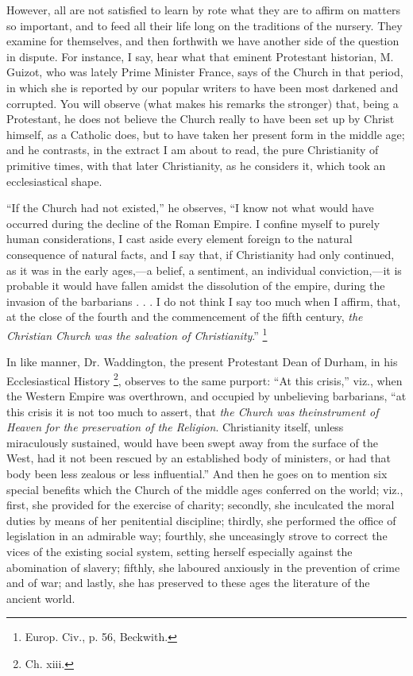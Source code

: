 However, all are not satisfied to learn by rote what
they are to affirm on matters so important, and to feed
all their life long on the traditions of the nursery.
They examine for themselves, and then forthwith we have
another side of the question in dispute. For instance, I
say, hear what that eminent Protestant historian, M.
Guizot, who was lately Prime Minister France, says of the
Church in that period, in which she is reported by our
popular writers to have been most darkened and corrupted.
You will observe (what makes his remarks the stronger)
that, being a Protestant, he does not believe the Church
really to have been set up by Christ himself, as a
Catholic does, but to have taken her present form in the
middle age; and he contrasts, in the extract I am about
to read, the pure Christianity of primitive times, with
that later Christianity, as he considers it, which took
an ecclesiastical shape.

``If the Church had not existed,'' he
observes, ``I know not what would have occurred
during the decline of the Roman Empire. I confine myself
to purely human considerations, I cast aside every
element foreign to the natural consequence of natural
facts, and I say that, if Christianity had only
continued, as it was in the early ages,—a belief, a
sentiment, an individual conviction,—it is probable
it would have fallen amidst the dissolution of the
empire, during the invasion of the barbarians . . . I do
not think I say too much when I affirm, that, at the
close of the fourth and the commencement of the fifth
century, \emph{the Christian
Church was the salvation of Christianity}.'' \footnote{Europ. Civ., p. 56, Beckwith.}

In like manner, Dr. Waddington, the present Protestant
Dean of Durham, in his Ecclesiastical History \footnote{Ch. xiii.}, observes to the same purport: ``At this
crisis,'' viz., when the Western Empire was
overthrown, and occupied by unbelieving barbarians,
``at this crisis it is not too much to assert, that \emph{the
Church was the}\emph{instrument of Heaven for the preservation
of the Religion}. Christianity itself, unless
miraculously sustained, would have been swept away from
the surface of the West, had it not been rescued by an
established body of ministers, or had that body been less
zealous or less influential.'' And then he goes on to
mention six special benefits which the Church of the
middle ages conferred on the world; viz., first, she
provided for the exercise of charity; secondly, she
inculcated the moral duties by means of her penitential
discipline; thirdly, she performed the office of
legislation in an admirable way; fourthly, she
unceasingly strove to correct the vices of the existing
social system, setting herself especially against the
abomination of slavery; fifthly, she laboured anxiously
in the prevention of crime and of war; and lastly, she
has preserved to these ages the literature of the ancient
world.

